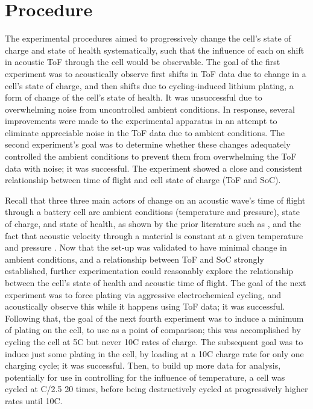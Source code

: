 \chapter{Procedure}
The experimental procedures aimed to progressively change the cell's state of charge and state of health systematically, such that the influence of each on shift in acoustic ToF through the cell would be observable.
The goal of the first experiment was to acoustically observe first shifts in ToF data due to change in a cell's state of charge, and then shifts due to cycling-induced lithium plating, a form of change of the cell's state of health. 
It was unsuccessful due to overwhelming noise from uncontrolled ambient conditions. 
In response, several improvements were made to the experimental apparatus in an attempt to eliminate appreciable noise in the ToF data due to ambient conditions. 
The second experiment's goal was to determine whether these changes adequately controlled the ambient conditions to prevent them from overwhelming the ToF data with noise; it was successful. 
The experiment showed a close and consistent relationship between time of flight and cell state of charge (ToF and SoC).

Recall that three three main actors of change on an acoustic wave's time of flight through a battery cell are ambient conditions (temperature and pressure), state of charge, and state of health, as shown by the prior literature such as \cite{SOC-SOH-EST}, and the fact that acoustic velocity through a material is constant at a given temperature and pressure \cite{OLYMPUS}. Now that the set-up was validated to have minimal change in ambient conditions, and a relationship between ToF and SoC strongly established, further experimentation could reasonably explore the relationship between the cell's state of health and acoustic time of flight. The goal of the next experiment was to force plating via aggressive electrochemical cycling, and acoustically observe this while it happens using ToF data; it was successful. Following that, the goal of the next fourth experiment was to induce a minimum of plating on the cell, to use as a point of comparison; this was accomplished by cycling the cell at 5C but never 10C rates of charge. The subsequent goal was to induce just some plating in the cell, by loading at a 10C charge rate for only one charging cycle; it was successful. Then, to build up more data for analysis, potentially for use in controlling for the influence of temperature, a cell was cycled at C/2.5 20 times, before being destructively cycled at progressively higher rates until 10C.

